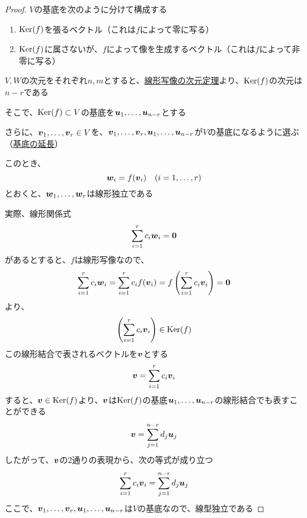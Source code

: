 \documentclass[../../../topic_linear-algebra]{subfiles}
\begin{document}
\begin{proof}
  $V$の基底を次のように分けて構成する
  \begin{enumerate}[label=\romanlabel]
    \item $\operatorname{Ker}(f)$を張るベクトル（これは$f$によって零に写る）
    \item $\operatorname{Ker}(f)$に属さないが、$f$によって像を生成するベクトル（これは$f$によって非零に写る）
  \end{enumerate}

  $V,W$の次元をそれぞれ$n,m$とすると、\hyperref[thm:rank-nullity-theorem]{線形写像の次元定理}より、$\operatorname{Ker}(f)$の次元は$n - r$である

  そこで、$\operatorname{Ker}(f) \subset V$の基底を$\vb*{u}_1,\ldots,\vb*{u}_{n-r}$とする

  さらに、$\vb*{v}_1,\ldots,\vb*{v}_r \in V$を、$\vb*{v}_1,\ldots,\vb*{v}_r,\vb*{u}_1,\ldots,\vb*{u}_{n-r}$が$V$の基底になるように選ぶ（\hyperref[thm:basis-extension]{基底の延長}）

  \br

  このとき、
  \begin{equation*}
    \vb*{w}_i =  f(\vb*{v}_i) \quad (i = 1, \ldots, r)
  \end{equation*}
  とおくと、$\vb*{w}_1,\ldots,\vb*{w}_r$は線形独立である

  実際、線形関係式
  \begin{equation*}
    \sum_{i=1}^r c_i \vb*{w}_i = \vb*{0}
  \end{equation*}
  があるとすると、$f$は線形写像なので、
  \begin{equation*}
    \sum_{i=1}^r c_i \vb*{w}_i = \sum_{i=1}^r c_i f(\vb*{v}_i) = f\left(\sum_{i=1}^r c_i \vb*{v}_i\right) = \vb*{0}
  \end{equation*}
  より、
  \begin{equation*}
    \left(\sum_{i=1}^r c_i \vb*{v}_i\right) \in \operatorname{Ker}(f)
  \end{equation*}
  この線形結合で表されるベクトルを$\vb*{v}$とする
  \begin{equation*}
    \vb*{v} = \sum_{i=1}^r c_i \vb*{v}_i
  \end{equation*}
  すると、$\vb*{v} \in \operatorname{Ker}(f)$より、$\vb*{v}$は$\operatorname{Ker}(f)$の基底$\vb*{u}_1,\ldots,\vb*{u}_{n-r}$の線形結合でも表すことができる
  \begin{equation*}
    \vb*{v} = \sum_{j=1}^{n-r} d_j \vb*{u}_j
  \end{equation*}
  したがって、$\vb*{v}$の2通りの表現から、次の等式が成り立つ
  \begin{equation*}
    \sum_{i=1}^r c_i \vb*{v}_i = \sum_{j=1}^{n-r} d_j \vb*{u}_j
  \end{equation*}
  ここで、$\vb*{v}_1,\ldots,\vb*{v}_r,\vb*{u}_1,\ldots,\vb*{u}_{n-r}$は$V$の基底なので、線型独立である


\end{proof}
\end{document}
